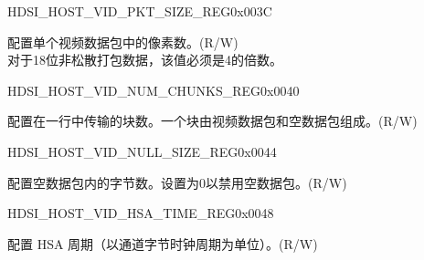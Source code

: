     
    \begin{register}{H}{DSI\_HOST\_VID\_PKT\_SIZE\_REG}{0x003C}\label{regdesc:DSIHOSTVIDPKTSIZEREG}
    \regnewline%
    \begin{regdesc}\begin{reglist}
    \label{fielddesc:DSIHOSTVIDPKTSIZE}\item [DSI\_HOST\_VID\_PKT\_SIZE] 配置单个视频数据包中的像素数。(R/W)\\
    对于18位非松散打包数据，该值必须是4的倍数。
    \end{reglist}\end{regdesc}
    \end{register}
    
    
    \begin{register}{H}{DSI\_HOST\_VID\_NUM\_CHUNKS\_REG}{0x0040}\label{regdesc:DSIHOSTVIDNUMCHUNKSREG}
    \regnewline%
    \begin{regdesc}\begin{reglist}
    \label{fielddesc:DSIHOSTVIDNUMCHUNKS}\item [DSI\_HOST\_VID\_NUM\_CHUNKS] 配置在一行中传输的块数。一个块由视频数据包和空数据包组成。(R/W)
    \end{reglist}\end{regdesc}
    \end{register}
    
    
    \begin{register}{H}{DSI\_HOST\_VID\_NULL\_SIZE\_REG}{0x0044}\label{regdesc:DSIHOSTVIDNULLSIZEREG}
    \regnewline%
    \begin{regdesc}\begin{reglist}
    \label{fielddesc:DSIHOSTVIDNULLSIZE}\item [DSI\_HOST\_VID\_NULL\_SIZE] 配置空数据包内的字节数。设置为0以禁用空数据包。(R/W)
    \end{reglist}\end{regdesc}
    \end{register}
    
    
    \begin{register}{H}{DSI\_HOST\_VID\_HSA\_TIME\_REG}{0x0048}\label{regdesc:DSIHOSTVIDHSATIMEREG}
    \regnewline%
    \begin{regdesc}\begin{reglist}
    \label{fielddesc:DSIHOSTVIDHSATIME}\item [DSI\_HOST\_VID\_HSA\_TIME] 配置 HSA 周期（以通道字节时钟周期为单位）。(R/W)
    \end{reglist}\end{regdesc}
    \end{register}
    
